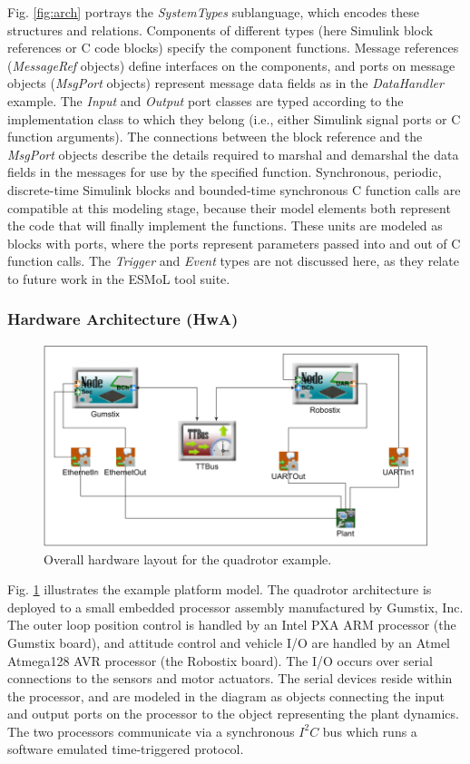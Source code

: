 Fig. \ref{fig:arch} portrays the \emph{SystemTypes} sublanguage, 
which encodes these structures and relations.  
Components of different types (here Simulink block references 
or C code blocks) specify the component functions.  Message 
references (\emph{MessageRef} objects) define interfaces 
on the components, and ports on message objects (\emph{MsgPort} objects)
represent message data fields as in the \emph{DataHandler} example.  
The \emph{Input} and \emph{Output} 
port classes are typed according to the implementation 
class to which they belong (i.e., either Simulink signal 
ports or C function arguments). The connections between the 
block reference and the \emph{MsgPort} objects describe the details 
required to marshal and demarshal the data fields in the messages 
for use by the specified function.  
Synchronous, periodic, discrete-time Simulink blocks and bounded-time
synchronous C function calls are compatible at this modeling 
stage, because their model 
elements both represent the code that will finally implement the 
functions.  These units are modeled as blocks with ports, where the ports 
represent parameters passed into and out of C function calls.
The \emph{Trigger} and \emph{Event} types are not discussed here,
as they relate to future work in the ESMoL tool suite.

\subsubsection*{Hardware Architecture (HwA)}

\begin{figure}
  \centering
  \includegraphics[width=0.8\columnwidth]{figures/quadrotor_hardware.png}
  \caption{Overall hardware layout for the quadrotor example.}
  \label{fig:qr_hardware}
\end{figure}

Fig. \ref{fig:qr_hardware} illustrates the example
platform model.  The quadrotor architecture
is deployed to a small embedded processor assembly 
manufactured by Gumstix, Inc.
The outer loop position control is handled by an Intel
PXA ARM processor (the Gumstix 
board), and attitude control and vehicle I/O are 
handled by an Atmel Atmega128 AVR processor (the 
Robostix board).  The I/O occurs over serial 
connections to the sensors and motor actuators.  
The serial devices reside within the processor, and are 
modeled in the diagram as objects connecting the 
input and output ports on the processor to the object 
representing the plant dynamics.  The two processors 
communicate via a synchronous $I^2C$ bus which runs
a software emulated time-triggered protocol.

